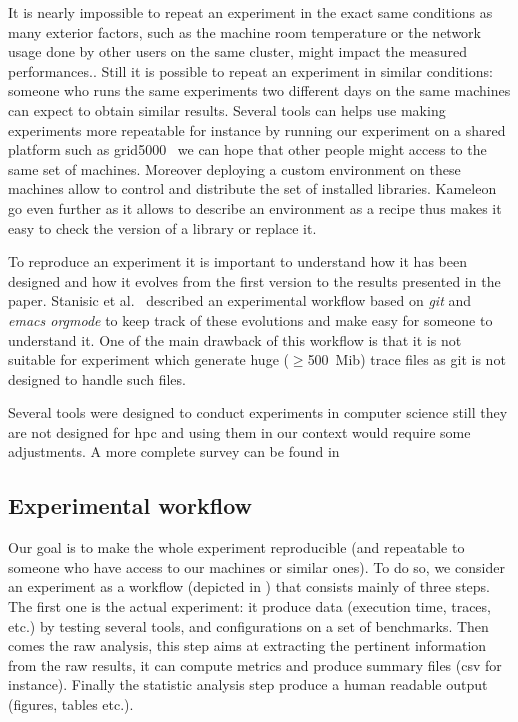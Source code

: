 It is nearly impossible to repeat an experiment in the exact same conditions
as many exterior factors, such as the machine room temperature or the network
usage done by other users on the same cluster, might impact the measured
performances..
Still it is possible to repeat an experiment in similar conditions: someone
who runs the same experiments two different days on the same machines can
expect to obtain similar results. Several tools can helps use making
experiments more repeatable for instance by running our experiment on a shared
platform such as grid5000~\cite{Cappello05Grid5000} we can hope that other
people might access to the same set of machines. Moreover deploying a custom
environment on these machines allow to control and distribute the set of
installed libraries. Kameleon~\cite{Ruiz15Reconstructable} go even
further as it allows to describe an environment as a recipe thus makes it easy
to check the version of a library or replace it.

To reproduce an experiment it is important to understand how it has been
designed and how it evolves from the first version to the results presented in
the paper. Stanisic et al.~\cite[Chapter~4, p31-44]{Stanisic15Reproducible}
described an experimental workflow based on \emph{git} and \emph{emacs orgmode}
to keep track of these evolutions and make easy for someone to understand it.
One of the main drawback of this workflow is that it is not suitable for
experiment which generate huge ($\ge$\SI{500}{Mib}) trace files as git is not
designed to handle such files.

Several tools were designed to conduct experiments in computer science still
they are not designed for \gls{hpc} and using them in our context would
require some adjustments. A more complete survey can be found
in~\cite[Chapter~3, p17-19]{Stanisic15Reproducible}

\subsection{Experimental workflow}

Our goal is to make the whole experiment reproducible (and repeatable to
someone who have access to our machines or similar ones). To do so, we
consider an experiment as a workflow (depicted in ) that
consists mainly of three steps. The first one is the actual experiment: it
produce data (execution time, traces, etc.) by testing several tools, and
configurations on a set of benchmarks. Then comes the raw analysis, this step
aims at extracting the pertinent information from the raw results, it can
compute metrics and produce summary files (csv for instance). Finally the
statistic analysis step produce a human readable output (figures, tables
etc.).

